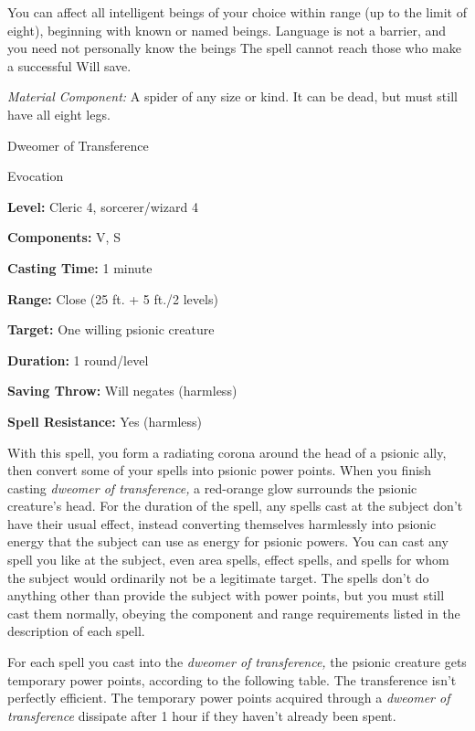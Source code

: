 \documentclass{article}
\begin{document}
You can affect all intelligent beings of your choice within range (up to the limit 
of eight), beginning with known or named beings. Language is not a barrier, and 
you need not personally know the beings The spell cannot reach those who make a 
successful Will save.

\textit{Material Component: }A spider of any size or kind. It can be dead, but 
must still have all eight legs.

\vspace{12pt}
Dweomer of Transference

Evocation

\textbf{Level: }Cleric 4, sorcerer/wizard 4

\textbf{Components:} V, S

\textbf{Casting Time:} 1 minute

\textbf{Range:} Close (25 ft. + 5 ft./2 levels)

\textbf{Target:} One willing psionic creature

\textbf{Duration:} 1 round/level

\textbf{Saving Throw:} Will negates (harmless)

\textbf{Spell Resistance:} Yes (harmless)

With this spell, you form a radiating corona around the head of a psionic ally, 
then convert some of your spells into psionic power points. When you finish casting 
\textit{dweomer of transference, }a red-orange glow surrounds the psionic creature's 
head. For the duration of the spell, any spells cast at the subject don't have 
their usual effect, instead converting themselves harmlessly into psionic energy 
that the subject can use as energy for psionic powers. You can cast any spell you 
like at the subject, even area spells, effect spells, and spells for whom the subject 
would ordinarily not be a legitimate target. The spells don't do anything other 
than provide the subject with power points, but you must still cast them normally, 
obeying the component and range requirements listed in the description of each 
spell.

For each spell you cast into the \textit{dweomer of transference, }the psionic 
creature gets temporary power points, according to the following table. The transference 
isn't perfectly efficient. The temporary power points acquired through a \textit{dweomer 
of transference }dissipate after 1 hour if they haven't already been spent.
\end{document}
